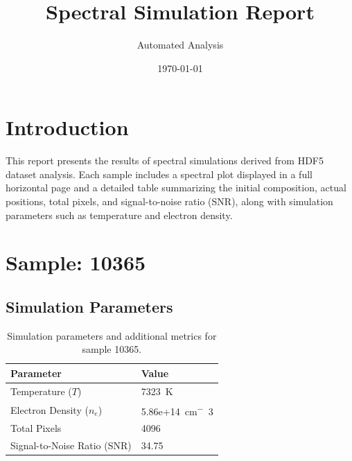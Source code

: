 \documentclass[a4paper,11pt]{article}
\title{Spectral Simulation Report}
\author{Automated Analysis}
\date{\today}
\begin{document}
\maketitle
\tableofcontents
\clearpage

\section{Introduction}
This report presents the results of spectral simulations derived from HDF5 dataset analysis. Each sample includes a spectral plot displayed in a full horizontal page and a detailed table summarizing the initial composition, actual positions, total pixels, and signal-to-noise ratio (SNR), along with simulation parameters such as temperature and electron density.


\section{Sample: 10365}
\subsection{Simulation Parameters}
\begin{table}[h!]
    \centering
    \begin{tabular}{ll}
        \toprule
        \textbf{Parameter} & \textbf{Value} \\
        \midrule
        Temperature ($T$) & 7323 \,\si{K} \\
        Electron Density ($n_e$) & 5.86e+14 \,\si{cm^-3} \\
        Total Pixels & 4096 \\
        Signal-to-Noise Ratio (SNR) & 34.75 \\
        \bottomrule
    \end{tabular}
    \caption{Simulation parameters and additional metrics for sample 10365.}
    \label{tab:params_10365}
\end{table}
\end{document}
